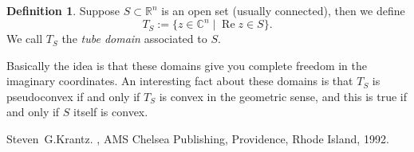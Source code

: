 \documentclass[12pt]{article}
\theoremstyle{theorem}
\theoremstyle{definition}
\newtheorem*{defn}{Definition}
\theoremstyle{remark}
\begin{document}
\begin{defn}
Suppose $S \subset {\mathbb{R}}^n$ is an open set (usually connected),
then we define 
\begin{equation*}
T_S := \{ z \in {\mathbb{C}}^n \mid \operatorname{Re} z \in S \} .
\end{equation*}
We call $T_S$ the {\em tube domain} associated to $S$.
\end{defn}

Basically the idea is that these domains give you complete freedom in the
imaginary coordinates.  An interesting fact about these domains is that
$T_S$ is pseudoconvex if and only if $T_S$ is convex in the geometric sense,
and this is true if and only if $S$ itself is convex.

\begin{thebibliography}{9}
Steven~G.\@ Krantz.
{\em {}},
AMS Chelsea Publishing, Providence, Rhode Island, 1992.
\end{thebibliography}
\end{document}
